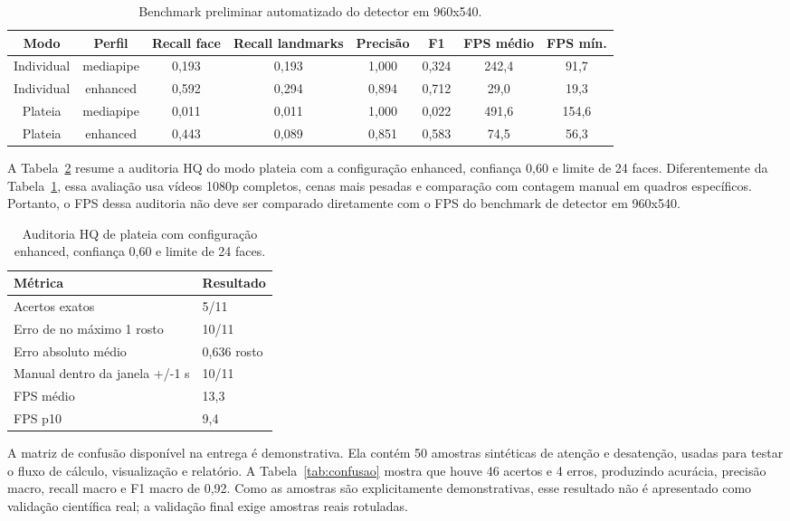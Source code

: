 \documentclass[12pt]{article}
\begin{document}
\begin{table}[!htbp]
\centering
\caption{Benchmark preliminar automatizado do detector em 960x540.}
\label{tab:benchmark}
\scriptsize
\begin{tabular}{|c|c|c|c|c|c|c|c|}
\hline
\textbf{Modo} & \textbf{Perfil} & \textbf{Recall face} & \textbf{Recall landmarks} & \textbf{Precisão} & \textbf{F1} & \textbf{FPS médio} & \textbf{FPS mín.}\\
\hline
Individual & mediapipe & 0,193 & 0,193 & 1,000 & 0,324 & 242,4 & 91,7\\
\hline
Individual & enhanced & 0,592 & 0,294 & 0,894 & 0,712 & 29,0 & 19,3\\
\hline
Plateia & mediapipe & 0,011 & 0,011 & 1,000 & 0,022 & 491,6 & 154,6\\
\hline
Plateia & enhanced & 0,443 & 0,089 & 0,851 & 0,583 & 74,5 & 56,3\\
\hline
\end{tabular}
\end{table}

A Tabela~\ref{tab:auditoria} resume a auditoria HQ do modo plateia com a configuração enhanced, confiança 0,60 e limite de 24 faces. Diferentemente da Tabela~\ref{tab:benchmark}, essa avaliação usa vídeos 1080p completos, cenas mais pesadas e comparação com contagem manual em quadros específicos. Portanto, o FPS dessa auditoria não deve ser comparado diretamente com o FPS do benchmark de detector em 960x540.

\begin{table}[!htbp]
\centering
\caption{Auditoria HQ de plateia com configuração enhanced, confiança 0,60 e limite de 24 faces.}
\label{tab:auditoria}
\small
\begin{tabular}{|p{6.8cm}|p{4.2cm}|}
\hline
\textbf{Métrica} & \textbf{Resultado}\\
\hline
Acertos exatos & 5/11\\
\hline
Erro de no máximo 1 rosto & 10/11\\
\hline
Erro absoluto médio & 0,636 rosto\\
\hline
Manual dentro da janela +/-1 s & 10/11\\
\hline
FPS médio & 13,3\\
\hline
FPS p10 & 9,4\\
\hline
\end{tabular}
\end{table}

A matriz de confusão disponível na entrega é demonstrativa. Ela contém 50 amostras sintéticas de atenção e desatenção, usadas para testar o fluxo de cálculo, visualização e relatório. A Tabela~\ref{tab:confusao} mostra que houve 46 acertos e 4 erros, produzindo acurácia, precisão macro, recall macro e F1 macro de 0,92. Como as amostras são explicitamente demonstrativas, esse resultado não é apresentado como validação científica real; a validação final exige amostras reais rotuladas.
\end{document}
